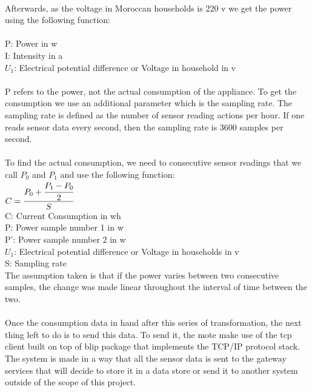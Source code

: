 \documentclass[oneside,12pt,a4paper,final]{book}
\begin{document}
\paragraph{}
Afterwards, as the voltage in Moroccan households is 220 \gls{v} we get the power using the following function:
\\
 \\
P: Power in \gls{w} \\
I: Intensity in \gls{a} \\
$U_1$: Electrical potential difference or Voltage in household in \gls{v}
\paragraph{}
P refers to the power, not the actual consumption of the appliance. To get the consumption we use an additional parameter which is the sampling rate. The sampling rate is defined as the number of sensor reading actions per hour. If one reads sensor data every second, then the sampling rate is 3600 samples per second.
\paragraph{}
To find the actual consumption, we need to consecutive sensor readings that we call $P_0$ and $P_1$ and use the following function:
\\
$ C = \cfrac{P_0 + \cfrac{P_1 - P_0}{2}}{S} $ \\
C: Current Consumption in \gls{wh} \\
P: Power sample number 1 in \gls{w} \\
P': Power sample number 2 in \gls{w} \\
$U_1$: Electrical potential difference or Voltage in households in \gls{v} \\
S: Sampling rate \\
The assumption taken is that if the power varies between two consecutive samples, the change was made linear throughout the interval of time between the two.
\paragraph{}
Once the consumption data in hand after this series of transformation, the next thing left to do is to send this data. To send it, the mote make use of the \gls{tcp}  client built on top of \gls{blip} package that implements the TCP/IP protocol stack. The system is made in a way that all the sensor data is sent to the gateway services that will decide to store it in a data store or send it to another system outside of the scope of this project.
\end{document}
